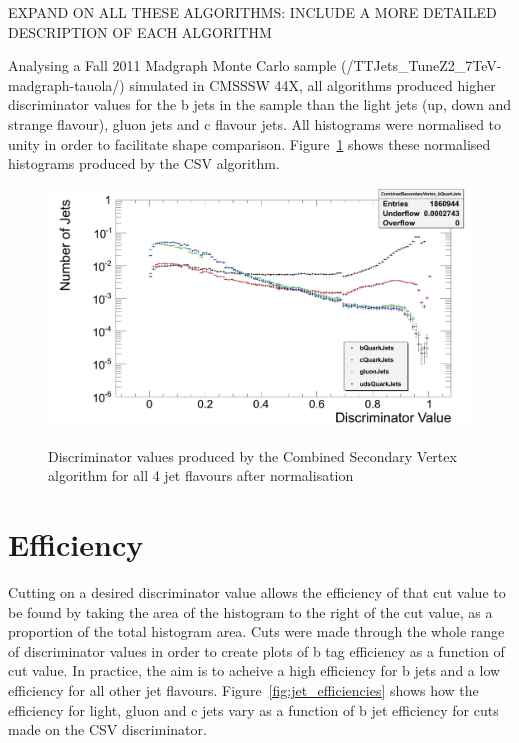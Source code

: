 EXPAND ON ALL THESE ALGORITHMS: INCLUDE A MORE DETAILED DESCRIPTION OF EACH ALGORITHM

Analysing a Fall 2011 \ttbar Madgraph Monte Carlo sample (/TTJets\_TuneZ2\_7TeV-madgraph-tauola/) simulated in
CMSSSW 44X, all algorithms produced higher discriminator values for the b jets in the sample than the light
jets (up, down and strange flavour), gluon jets and c flavour jets. All histograms were normalised to unity in
order to facilitate shape comparison. Figure~\ref{fig:CSV_discriminators} shows these normalised histograms
produced by the CSV algorithm.

\begin{figure}[hbtp]
   \centering
     \includegraphics[width=\textwidth]{Chapters/04_Analysis/04a_BTags/Images/CombinedSecondaryVertex_discriminator_combined}\\
     \caption{Discriminator values produced by the Combined Secondary Vertex algorithm for all 4 jet flavours after normalisation}
     \label{fig:CSV_discriminators}
\end{figure}

\section{Efficiency}
\label{s:efficiency}

Cutting on a desired discriminator value allows the efficiency of that cut value to be found by taking the
area of the histogram to the right of the cut value, as a proportion of the total histogram area. Cuts were
made through the whole range of discriminator values in order to create plots of b tag efficiency as a
function of cut value. In practice, the aim is to acheive a high efficiency for b jets and a low efficiency
for all other jet flavours. Figure~\ref{fig:jet_efficiencies} shows how the efficiency for light, gluon and c
jets vary as a function of b jet efficiency for cuts made on the CSV discriminator.

